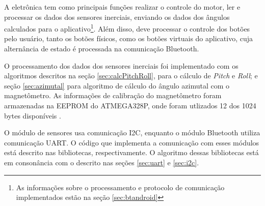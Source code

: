 A eletrônica tem como principais funções realizar o controle do motor, ler e processar os dados dos sensores inerciais, enviando os dados dos ângulos calculados para o aplicativo\footnote{As informações sobre o processamento e protocolo de comunicação implementados estão na seção \ref{sec:btandroid}}. Além disso, deve processar o controle dos botões pelo usuário, tanto os botões físicos, como os botões virtuais do aplicativo, cuja alternância de estado é processada na comunicação Bluetooth. 

O processamento dos dados dos sensores inerciais foi implementado com os algoritmos descritos na seção \ref{sec:calcPitchRoll}, para o cálculo de \textit{Pitch} e \textit{Roll}; e seção \ref{sec:azimutal} para algoritmo de cálculo do ângulo azimutal com o magnetômetro. As informações de calibração do magnetômetro foram armazenadas na EEPROM do ATMEGA328P, onde foram utlizados 12 dos 1024 bytes disponíveis \cite{man:atmegadatasheet}.

O módulo de sensores usa comunicação I2C, enquanto o módulo Bluetooth utiliza comunicação UART. O código que implementa a comunicação com esses módulos está descrito nas bibliotecas, respectivamente. O algoritmo dessas bibliotecas está em consonância com o descrito nas seções \ref{sec:uart} e \ref{sec:i2c}.
